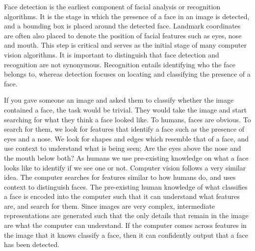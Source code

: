 \documentclass{l4proj}
\begin{document}
Face detection is the earliest component of facial analysis or recognition algorithms. It is the stage in which the presence of a face in an image is detected, and a bounding box is placed around the detected face. Landmark coordinates are often also placed to denote the position of facial features such as eyes, nose and mouth. This step is critical and serves as the initial stage of many computer vision algorithms. It is important to distinguish that face detection and recognition are not synonymous. Recognition entails identifying who the face belongs to, whereas detection focuses on locating and classifying the presence of a face.

If you gave someone an image and asked them to classify whether the image contained a face, the task would be trivial. They would take the image and start searching for what they think a face looked like. To humans, faces are obvious. To search for them, we look for features that identify a face such as the presence of eyes and a nose. We look for shapes and edges which resemble that of a face, and use context to understand what is being seen; Are the eyes above the nose and the mouth below both? As humans we use pre-existing knowledge on what a face looks like to identify if we see one or not. Computer vision follows a very similar idea. The computer searches for features similar to how humans do, and uses context to distinguish faces. The pre-existing human knowledge of what classifies a face is encoded into the computer such that it can understand what features are, and search for them. Since images are very complex, intermediate representations are generated such that the only details that remain in the image are what the computer can understand. If the computer comes across features in the image that it knows classify a face, then it can confidently output that a face has been detected.
\end{document}
